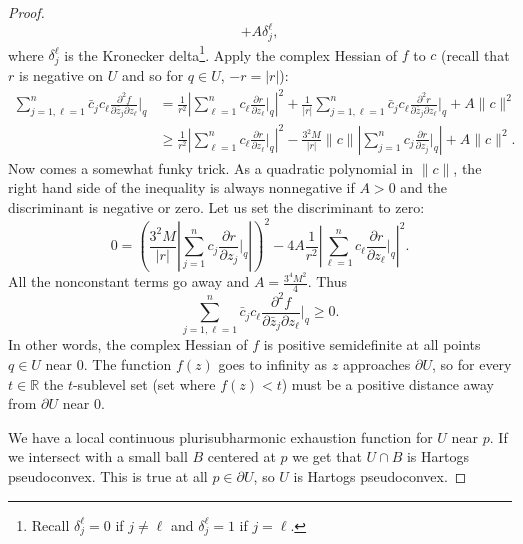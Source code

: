 \documentclass[12pt,openany]{book}
\newcommand{\sabs}[1]{\lvert {#1} \rvert}
\newcommand{\snorm}[1]{\lVert {#1} \rVert}
\newcommand{\abs}[1]{\left\lvert {#1} \right\rvert}
\newcommand{\R}{{\mathbb{R}}}
\theoremstyle{plain}
\theoremstyle{remark}
\theoremstyle{definition}
\theoremstyle{exercise}
\theoremstyle{example}
\begin{document}
\begin{proof}
\begin{equation*}
+
A\delta_{j}^{\ell} ,
\end{equation*}
where $\delta_j^\ell$ is the Kronecker delta\footnote{%
Recall $\delta_j^\ell = 0$ if $j\not= \ell$ and $\delta_j^\ell = 1$ if $j =
\ell$.}.
Apply the complex Hessian of $f$ to $c$ (recall that $r$ is negative
on $U$ and so for $q \in U$, $-r = \sabs{r}$):
\begin{equation*}
\begin{split}
\sum_{j=1,\ell=1}^n
\bar{c}_j c_\ell \frac{\partial^2 f}{\partial \bar{z}_j \partial z_\ell} \Big|_q 
& =
\frac{1}{r^2}
\abs{
\sum_{\ell=1}^n
c_\ell
\frac{\partial r}{\partial z_\ell} \Big|_q
}^2
+
\frac{1}{\sabs{r}}
\sum_{j=1,\ell=1}^n
\bar{c}_j
c_\ell
\frac{\partial^2 r}{\partial \bar{z}_j \partial z_\ell} \Big|_q
+
A \snorm{c}^2
\\
& \geq
\frac{1}{r^2}
\abs{
\sum_{\ell=1}^n
c_\ell
\frac{\partial r}{\partial z_\ell} \Big|_q
}^2
-
\frac{3^2 M}{\sabs{r}}
\snorm{c}\abs{\sum_{j=1}^n c_j \frac{\partial r}{\partial z_j} \Big|_q} 
+
A \snorm{c}^2 .
\end{split}
\end{equation*}
Now comes a somewhat funky trick.
As a quadratic polynomial in $\snorm{c}$, the right hand side of the
inequality
is always nonnegative if $A > 0$ and the discriminant is negative or zero.
Let us set the discriminant to zero:
\begin{equation*}
0 = 
{\left(
\frac{3^2 M}{\sabs{r}}
\abs{\sum_{j=1}^n c_j \frac{\partial r}{\partial z_j} \Big|_q}
\right)}^2
- 4A 
\frac{1}{r^2}
\abs{
\sum_{\ell=1}^n
c_\ell
\frac{\partial r}{\partial z_\ell} \Big|_q
}^2 .
\end{equation*}
All the nonconstant terms go away and 
$A=\frac{3^4 M^2}{4}$.  Thus
\begin{equation*}
\sum_{j=1,\ell=1}^n
\bar{c}_j c_\ell \frac{\partial^2 f}{\partial \bar{z}_j \partial z_\ell} \Big|_q 
\geq 0.
\end{equation*}
In other words, the complex Hessian
of $f$ is positive semidefinite at all points $q \in U$ near $0$.
The function $f(z)$ goes to infinity as $z$ approaches $\partial U$, so
for every $t \in \R$ the $t$-sublevel set
(set where $f(z) < t$) must be a positive
distance away from $\partial U$ near $0$.

We have a local continuous plurisubharmonic
exhaustion function for $U$ near $p$.  If we intersect
with a small ball $B$ centered at $p$ we get that $U \cap B$ is
Hartogs pseudoconvex.  This is true at all
$p \in \partial U$, so $U$ is Hartogs pseudoconvex.
\end{proof}
\end{document}
